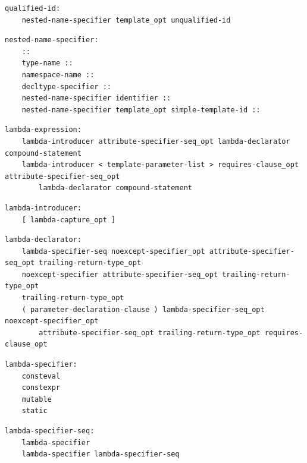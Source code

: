 \noindent\textbf{\texttt{}}\par
\begin{lstlisting}
qualified-id:
    nested-name-specifier template_opt unqualified-id
\end{lstlisting}

\noindent\textbf{\texttt{}}\par
\begin{lstlisting}
nested-name-specifier:
    ::
    type-name ::
    namespace-name ::
    decltype-specifier ::
    nested-name-specifier identifier ::
    nested-name-specifier template_opt simple-template-id ::
\end{lstlisting}

\noindent\textbf{\texttt{}}\par
\begin{lstlisting}
lambda-expression:
    lambda-introducer attribute-specifier-seq_opt lambda-declarator compound-statement
    lambda-introducer < template-parameter-list > requires-clause_opt attribute-specifier-seq_opt
        lambda-declarator compound-statement
\end{lstlisting}

\noindent\textbf{\texttt{}}\par
\begin{lstlisting}
lambda-introducer:
    [ lambda-capture_opt ]
\end{lstlisting}

\noindent\textbf{\texttt{}}\par
\begin{lstlisting}
lambda-declarator:
    lambda-specifier-seq noexcept-specifier_opt attribute-specifier-seq_opt trailing-return-type_opt
    noexcept-specifier attribute-specifier-seq_opt trailing-return-type_opt
    trailing-return-type_opt
    ( parameter-declaration-clause ) lambda-specifier-seq_opt noexcept-specifier_opt
        attribute-specifier-seq_opt trailing-return-type_opt requires-clause_opt
\end{lstlisting}

\noindent\textbf{\texttt{}}\par
\begin{lstlisting}
lambda-specifier:
    consteval
    constexpr
    mutable
    static
\end{lstlisting}

\noindent\textbf{\texttt{}}\par
\begin{lstlisting}
lambda-specifier-seq:
    lambda-specifier
    lambda-specifier lambda-specifier-seq
\end{lstlisting}


